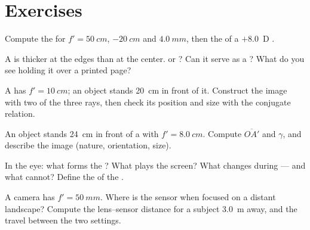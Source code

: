\section{Exercises}

\begin{exercise}[$\star$]\label{exo:g11:lenses-and-eye:1}
Compute the  for $f' = \qty{50}{cm}$, $\qty{-20}{cm}$ and
$\qty{4.0}{mm}$, then the  of a $+8.0$~D .
\end{exercise}

\begin{exercise}[$\star$]\label{exo:g11:lenses-and-eye:2}
A  is thicker at the edges than at the center.  or
? Can it serve as a ? What do you see holding it
over a printed page?
\end{exercise}

\begin{exercise}[$\star$]\label{exo:g11:lenses-and-eye:3}
A  has $f' = \qty{10}{cm}$; an object stands
\qty{20}{cm} in front of it. Construct the image with two of the three
rays, then check its position and size with the conjugate relation.
\end{exercise}

\begin{exercise}[$\star$]\label{exo:g11:lenses-and-eye:4}
An object stands \qty{24}{cm} in front of a  with
$f' = \qty{8.0}{cm}$. Compute $\overline{OA'}$ and $\gamma$, and
describe the image (nature, orientation, size).
\end{exercise}

\begin{exercise}[$\star$]\label{exo:g11:lenses-and-eye:5}
In the eye: what forms the ? What plays the screen? What
changes during  --- and what cannot? Define the 
of the .
\end{exercise}

\begin{exercise}[$\star\star$]\label{exo:g11:lenses-and-eye:6}
A camera  has $f' = \qty{50}{mm}$. Where is the sensor when focused
on a distant landscape? Compute the lens--sensor distance for a subject
\qty{3.0}{m} away, and the travel between the two settings.
\end{exercise}

